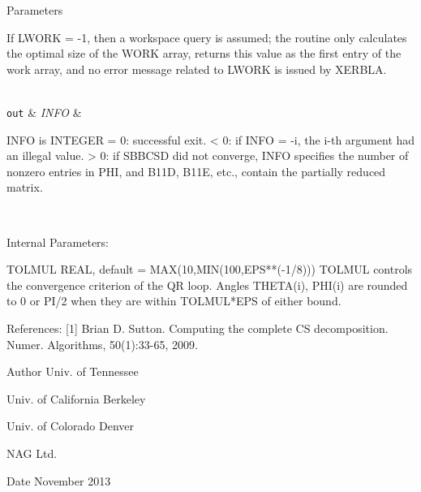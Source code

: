 \begin{DoxyParams}[1]{Parameters}
\begin{DoxyVerb}
          If LWORK = -1, then a workspace query is assumed; the
          routine only calculates the optimal size of the WORK array,
          returns this value as the first entry of the work array, and
          no error message related to LWORK is issued by XERBLA.\end{DoxyVerb}
\\
\hline
\mbox{\tt out}  & {\em I\+N\+F\+O} & \begin{DoxyVerb}          INFO is INTEGER
          = 0:  successful exit.
          < 0:  if INFO = -i, the i-th argument had an illegal value.
          > 0:  if SBBCSD did not converge, INFO specifies the number
                of nonzero entries in PHI, and B11D, B11E, etc.,
                contain the partially reduced matrix.\end{DoxyVerb}
 \\
\hline
\end{DoxyParams}
\begin{DoxyParagraph}{Internal Parameters\+: }
\begin{DoxyVerb}  TOLMUL  REAL, default = MAX(10,MIN(100,EPS**(-1/8)))
          TOLMUL controls the convergence criterion of the QR loop.
          Angles THETA(i), PHI(i) are rounded to 0 or PI/2 when they
          are within TOLMUL*EPS of either bound.\end{DoxyVerb}
 
\end{DoxyParagraph}
\begin{DoxyParagraph}{References\+: }
\mbox{[}1\mbox{]} Brian D. Sutton. Computing the complete C\+S decomposition. Numer. Algorithms, 50(1)\+:33-\/65, 2009. 
\end{DoxyParagraph}
\begin{DoxyAuthor}{Author}
Univ. of Tennessee 

Univ. of California Berkeley 

Univ. of Colorado Denver 

N\+A\+G Ltd. 
\end{DoxyAuthor}
\begin{DoxyDate}{Date}
November 2013 
\end{DoxyDate}
